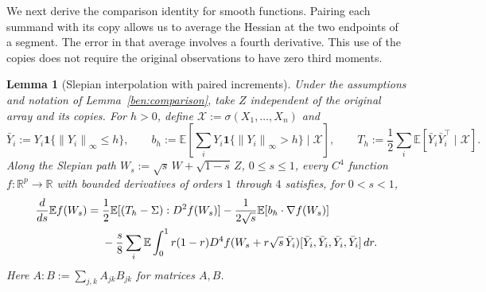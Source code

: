 \documentclass[11pt,letterpaper]{article}
\newtheorem{lemma}{Lemma}
\theoremstyle{remark}
\newcommand{\E}{\mathbb E}
\newcommand{\R}{\mathbb R}
\newcommand{\norm}[1]{\left\lVert#1\right\rVert}
\newcommand{\ind}{\mathbf 1}
\begin{document}
We next derive the comparison identity for smooth functions.
Pairing each summand with its copy allows us to average the
Hessian at the two endpoints of a segment. The error in that
average involves a fourth derivative. This use of the copies
does not require the original observations to have zero third moments.

\begin{lemma}[Slepian interpolation with paired increments]
\label{ben:paired-interpolation}
Under the assumptions and notation of Lemma~\ref{ben:comparison},
take $Z$ independent of the original array and its copies. For
$h>0$, define $\mathcal X:=\sigma(X_1,\ldots,X_n)$ and
\[
 \bar Y_i:=Y_i\ind\{\norm{Y_i}_\infty\le h\},\qquad
 b_h:=\E\left[\sum_iY_i\ind\{\norm{Y_i}_\infty>h\}
                    \mid\mathcal X\right],\qquad
 T_h:=\frac12\sum_i\E[\bar Y_i\bar Y_i^\top\mid\mathcal X].
\]
Along the Slepian path
$W_s:=\sqrt s\,W+\sqrt{1-s}\,Z$, $0\le s\le1$,
every $C^4$ function $f:\R^p\to\R$ with bounded derivatives
of orders $1$ through $4$ satisfies, for $0<s<1$,
\begin{align}
 \frac d{ds}\E f(W_s)
 ={}&\frac12\E[(T_h-\Sigma):D^2f(W_s)]
       -\frac1{2\sqrt s}\E[b_h\cdot\nabla f(W_s)]\notag\\
 &-\frac{s}{8}\sum_i\E\int_0^1 r(1-r)
 D^4f(W_s+r\sqrt s\,\bar Y_i)
          [\bar Y_i,\bar Y_i,\bar Y_i,\bar Y_i]\,dr.
 \label{ben:slepian-identity}
\end{align}
Here $A:B:=\sum_{j,k}A_{jk}B_{jk}$ for matrices $A,B$.
\end{lemma}
\end{document}
